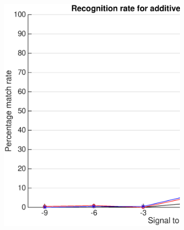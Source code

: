 \documentclass[12pt,a4paper,twoside,openright]{report}
\begin{document}
\begin{figure}[p]
    \centering

    \begin{subfigure}{\textwidth}
      \includegraphics[width=\textwidth]{./figs/natural_philips_results.eps}
    \end{subfigure}

    \vspace{10mm}


\end{figure}
\end{document}
